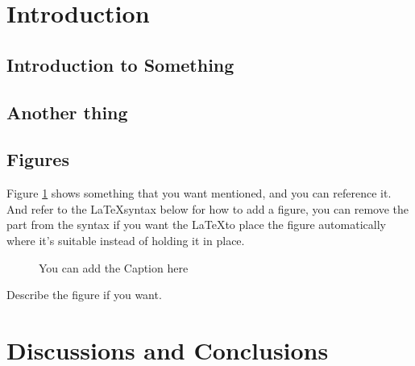 \documentclass[titlepage,12pt]{unisubmission}
\date{\today}
\begin{document}
\maketitle

\section{Introduction}
\label{sec:intro}

\subsection{Introduction to Something}
\label{subsec:intro-sth}

\lipsum[2-4]

\subsection{Another thing}
\label{subsec:another-thing}
\lipsum[4]

\subsection{Figures}
\label{subsec:figures}

Figure \ref{fig:testfig} shows something that you want mentioned, and you can reference it. And refer to the \LaTeX syntax below for how to add a figure, you can remove the \backt{[H]} part from the syntax if you want the \LaTeX to place the figure automatically where it's suitable instead of holding it in place.


\begin{figure}[H]\centering
  \caption{You can add the Caption here}
  \label{fig:testfig}
\end{figure}

Describe the figure if you want.

\section{Discussions and Conclusions}
\label{sec:conclusions}


\lipsum[4]
\end{document}
